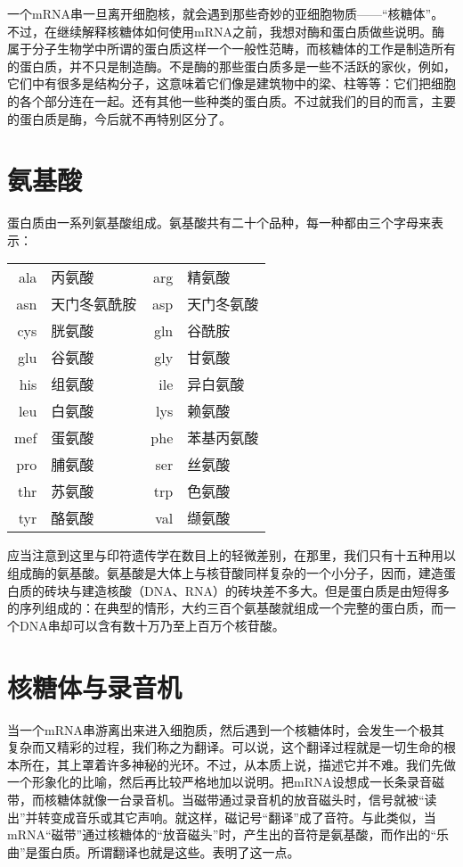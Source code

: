 一个mRNA串一旦离开细胞核，就会遇到那些奇妙的亚细胞物质——“核糖体”。不过，在继续解释核糖体如何使用mRNA之前，我想对酶和蛋白质做些说明。酶属于分子生物学中所谓的蛋白质这样一个一般性范畴，而核糖体的工作是制造所有的蛋白质，并不只是制造酶。不是酶的那些蛋白质多是一些不活跃的家伙，例如，它们中有很多是结构分子，这意味着它们像是建筑物中的梁、柱等等：它们把细胞的各个部分连在一起。还有其他一些种类的蛋白质。不过就我们的目的而言，主要的蛋白质是酶，今后就不再特别区分了。

\section{氨基酸}

蛋白质由一系列氨基酸组成。氨基酸共有二十个品种，每一种都由三个字母来表示：
\begin{longtable}[c]{r!{——}l!{\qquad}r!{——}l}
ala & 丙氨酸 &
arg & 精氨酸\\
asn & 天门冬氨酰胺 &
asp & 天门冬氨酸\\
cys & 胱氨酸 &
gln & 谷酰胺\\
glu & 谷氨酸 &
gly & 甘氨酸\\
his & 组氨酸 &
ile & 异白氨酸\\
leu & 白氨酸 &
lys & 赖氨酸\\
mef & 蛋氨酸 &
phe & 苯基丙氨酸\\
pro & 脯氨酸 &
ser & 丝氨酸\\
thr & 苏氨酸 &
trp & 色氨酸\\
tyr & 酪氨酸 &
val & 缬氨酸
\end{longtable}
应当注意到这里与印符遗传学在数目上的轻微差别，在那里，我们只有十五种用以组成酶的氨基酸。氨基酸是大体上与核苷酸同样复杂的一个小分子，因而，建造蛋白质的砖块与建造核酸（DNA、RNA）的砖块差不多大。但是蛋白质是由短得多的序列组成的：在典型的情形，大约三百个氨基酸就组成一个完整的蛋白质，而一个DNA串却可以含有数十万乃至上百万个核苷酸。

\section{核糖体与录音机}

当一个mRNA串游离出来进入细胞质，然后遇到一个核糖体时，会发生一个极其复杂而又精彩的过程，我们称之为翻译。可以说，这个翻译过程就是一切生命的根本所在，其上罩着许多神秘的光环。不过，从本质上说，描述它并不难。我们先做一个形象化的比喻，然后再比较严格地加以说明。把mRNA设想成一长条录音磁带，而核糖体就像一台录音机。当磁带通过录音机的放音磁头时，信号就被“读出”并转变成音乐或其它声响。就这样，磁记号“翻译”成了音符。与此类似，当mRNA“磁带”通过核糖体的“放音磁头”时，产生出的音符是氨基酸，而作出的“乐曲”是蛋白质。所谓翻译也就是这些。表明了这一点。

